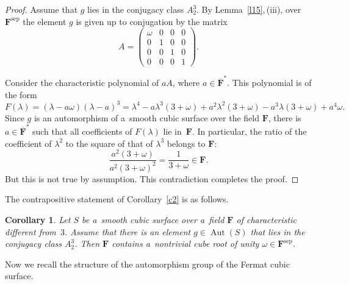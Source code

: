 \documentclass{amsart}
\numberwithin{equation}{section}
\theoremstyle{plain}
\newtheorem{corollary}{Corollary}
\theoremstyle{definition}
\theoremstyle{remark}
\begin{document}
\begin{proof}
Assume that $g$ lies in the conjugacy class $A_2^3$. By Lemma~\ref{l15},\,(iii), over $\mathbf{F}^{\mathrm{sep}}$ the element $g$ is given up to conjugation by the matrix
$$
A=\begin{pmatrix}
\omega & 0 & 0 & 0\\
0 & 1 & 0 & 0\\
0 & 0 & 1 & 0\\
0 & 0 & 0 & 1
\end{pmatrix}.
$$

Consider the characteristic polynomial of $aA$, where $a \in \overline{\mathbf{F}}^*$. This polynomial is of the form
$$
F(\lambda)=(\lambda-a\omega)(\lambda-a)^3=\lambda^4-a\lambda^3(3+\omega)+a^2\lambda^2(3+\omega)-a^3\lambda(3+\omega)+a^4\omega.
$$
Since $g$ is an automorphism of a~smooth cubic surface over the field $\mathbf{F}$, there is~\mbox{$a \in \overline{\mathbf{F}}^*$} such that all coefficients of $F(\lambda)$ lie in~$\mathbf{F}$. In particular, the ratio of the coefficient of $\lambda^2$ to the square of that of $\lambda^3$ belongs to $\mathbf{F}$:
$$
\frac{a^2(3+\omega)}{a^2(3+\omega)^2}=\frac{1}{3+\omega} \in \mathbf{F}.
$$
But this is not true by assumption. This contradiction completes the proof.
\end{proof}

The contrapositive statement of Corollary~\ref{c2} is as follows.

\begin{corollary}
\label{c3}
Let $S$ be a~smooth cubic surface over a~field $\mathbf{F}$ of characteristic different from~$3$. Assume that there is an element $g \in \operatorname{Aut}(S)$ that lies in the conjugacy class $A^3_2$. Then $\mathbf{F}$ contains a~nontrivial cube root of unity $\omega \in \mathbf{F}^{\mathrm{sep}}$.
\end{corollary}

Now we recall the structure of the automorphism group of the Fermat cubic surface.
\end{document}
